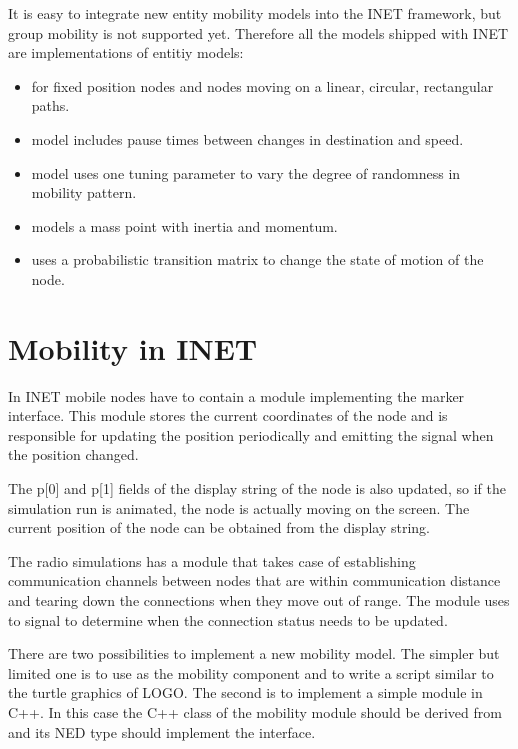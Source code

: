 It is easy to integrate new entity mobility models into the INET framework,
but group mobility is not supported yet. Therefore all the models
shipped with INET are implementations of entitiy models:

\begin{itemize}
\item {} for fixed position nodes and nodes
      moving on a linear, circular, rectangular paths.
\item {} model includes pause times between changes
      in destination and speed.
\item {} model uses one tuning parameter to vary the degree
      of randomness in mobility pattern.
\item {} models a mass point with inertia and momentum.
\item {} uses a probabilistic transition matrix to change
      the state of motion of the node.
\end{itemize}

\section{Mobility in INET}

In INET mobile nodes have to contain a module implementing the
 marker interface. This module stores the current
coordinates of the node and is responsible for updating the position
periodically and emitting the  signal
when the position changed.

The p[0] and p[1] fields of the display string of the node is
also updated, so if the simulation run is animated, the node is
actually moving on the screen. The current position of the node
can be obtained from the display string.

The radio simulations has a  module that takes case of
establishing communication channels between nodes that are within
communication distance and tearing down the connections when they
move out of range. The  module uses to
 signal to determine when the connection
status needs to be updated.

There are two possibilities to implement a new mobility model. The simpler but
limited one is to use  as the mobility component and to
write a script similar to the turtle graphics of LOGO. The second is to
implement a simple module in C++. In this case the C++ class of the mobility
module should be derived from  and its NED type should
implement the  interface.

